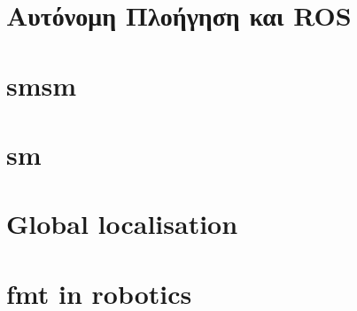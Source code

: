 \section{Αυτόνομη Πλοήγηση και ROS}
  

\section{smsm}
  

\section{sm}
  

\section{Global localisation}
  

\section{fmt in robotics}
  

